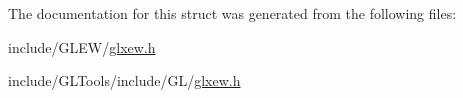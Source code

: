 The documentation for this struct was generated from the following files\-:\begin{DoxyCompactItemize}
\item 
include/\-G\-L\-E\-W/\hyperlink{_g_l_e_w_2glxew_8h}{glxew.\-h}\item 
include/\-G\-L\-Tools/include/\-G\-L/\hyperlink{_g_l_tools_2include_2_g_l_2glxew_8h}{glxew.\-h}\end{DoxyCompactItemize}
